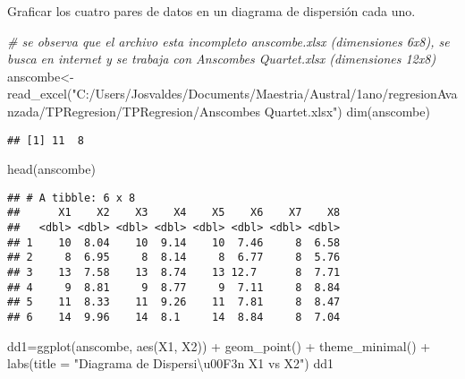 \documentclass[
]{article}
\newenvironment{Shaded}{\begin{snugshade}}{\end{snugshade}}
\newcommand{\AttributeTok}[1]{\textcolor[rgb]{0.77,0.63,0.00}{#1}}
\newcommand{\CommentTok}[1]{\textcolor[rgb]{0.56,0.35,0.01}{\textit{#1}}}
\newcommand{\FunctionTok}[1]{\textcolor[rgb]{0.00,0.00,0.00}{#1}}
\newcommand{\NormalTok}[1]{#1}
\newcommand{\OtherTok}[1]{\textcolor[rgb]{0.56,0.35,0.01}{#1}}
\newcommand{\SpecialCharTok}[1]{\textcolor[rgb]{0.00,0.00,0.00}{#1}}
\newcommand{\StringTok}[1]{\textcolor[rgb]{0.31,0.60,0.02}{#1}}
\begin{document}
Graficar los cuatro pares de datos en un diagrama de dispersión cada
uno.

\begin{Shaded}
\begin{Highlighting}[]
\CommentTok{\# se observa que el archivo esta incompleto anscombe.xlsx (dimensiones 6x8), se busca en internet y se trabaja con Anscombe\textquotesingle{}s Quartet.xlsx (dimensiones 12x8)}
\NormalTok{anscombe}\OtherTok{\textless{}{-}}\FunctionTok{read\_excel}\NormalTok{(}\StringTok{"C:/Users/Josvaldes/Documents/Maestria/Austral/1ano/regresionAvanzada/TPRegresion/TPRegresion/Anscombe\textquotesingle{}s Quartet.xlsx"}\NormalTok{)}
\FunctionTok{dim}\NormalTok{(anscombe)}
\end{Highlighting}
\end{Shaded}

\begin{verbatim}
## [1] 11  8
\end{verbatim}

\begin{Shaded}
\begin{Highlighting}[]
\FunctionTok{head}\NormalTok{(anscombe)}
\end{Highlighting}
\end{Shaded}

\begin{verbatim}
## # A tibble: 6 x 8
##      X1    X2    X3    X4    X5    X6    X7    X8
##   <dbl> <dbl> <dbl> <dbl> <dbl> <dbl> <dbl> <dbl>
## 1    10  8.04    10  9.14    10  7.46     8  6.58
## 2     8  6.95     8  8.14     8  6.77     8  5.76
## 3    13  7.58    13  8.74    13 12.7      8  7.71
## 4     9  8.81     9  8.77     9  7.11     8  8.84
## 5    11  8.33    11  9.26    11  7.81     8  8.47
## 6    14  9.96    14  8.1     14  8.84     8  7.04
\end{verbatim}

\begin{Shaded}
\begin{Highlighting}[]
\NormalTok{dd1}\OtherTok{=}\FunctionTok{ggplot}\NormalTok{(anscombe, }\FunctionTok{aes}\NormalTok{(X1, X2)) }\SpecialCharTok{+} 
  \FunctionTok{geom\_point}\NormalTok{() }\SpecialCharTok{+} \FunctionTok{theme\_minimal}\NormalTok{() }\SpecialCharTok{+} \FunctionTok{labs}\NormalTok{(}\AttributeTok{title =} \StringTok{"Diagrama de Dispersi\textbackslash{}u00F3n X1 vs X2"}\NormalTok{)}
\NormalTok{dd1}
\end{Highlighting}
\end{Shaded}
\end{document}
